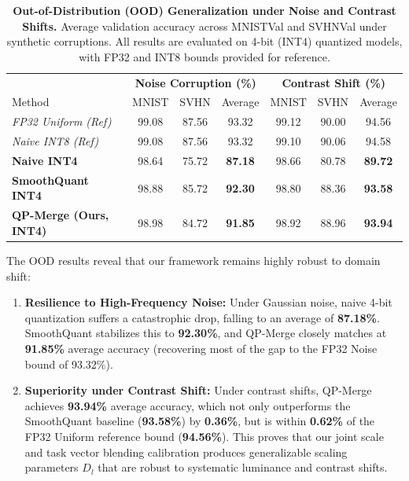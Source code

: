 \begin{table}[t]
\caption{\textbf{Out-of-Distribution (OOD) Generalization under Noise and Contrast Shifts.} Average validation accuracy across MNISTVal and SVHNVal under synthetic corruptions. All results are evaluated on 4-bit (INT4) quantized models, with FP32 and INT8 bounds provided for reference.}
\label{tab:ood_results}
\vskip 0.15in
\begin{center}
\begin{small}
\begin{sc}
\begin{tabular}{lcccccc}
\toprule
 & \multicolumn{3}{c}{\textbf{Noise Corruption (\%)}} & \multicolumn{3}{c}{\textbf{Contrast Shift (\%)}} \\
Method & MNIST & SVHN & Average & MNIST & SVHN & Average \\
\midrule
\textit{FP32 Uniform (Ref)} & 99.08 & 87.56 & 93.32 & 99.12 & 90.00 & 94.56 \\
\textit{Naive INT8 (Ref)}   & 99.08 & 87.56 & 93.32 & 99.10 & 90.06 & 94.58 \\
\midrule
\textbf{Naive INT4}         & 98.64 & 75.72 & \textbf{87.18} & 98.66 & 80.78 & \textbf{89.72} \\
\textbf{SmoothQuant INT4}   & 98.88 & 85.72 & \textbf{92.30} & 98.80 & 88.36 & \textbf{93.58} \\
\textbf{QP-Merge (Ours, INT4)} & 98.98 & 84.72 & \textbf{91.85} & 98.92 & 88.96 & \textbf{93.94} \\
\bottomrule
\end{tabular}
\end{sc}
\end{small}
\end{center}
\vskip -0.1in
\end{table}

The OOD results reveal that our framework remains highly robust to domain shift:
\begin{enumerate}
    \item \textbf{Resilience to High-Frequency Noise:} Under Gaussian noise, naive 4-bit quantization suffers a catastrophic drop, falling to an average of \textbf{87.18\%}. SmoothQuant stabilizes this to \textbf{92.30\%}, and QP-Merge closely matches at \textbf{91.85\%} average accuracy (recovering most of the gap to the FP32 Noise bound of 93.32\%).
    \item \textbf{Superiority under Contrast Shift:} Under contrast shifts, QP-Merge achieves \textbf{93.94\%} average accuracy, which not only outperforms the SmoothQuant baseline (\textbf{93.58\%}) by \textbf{0.36\%}, but is within \textbf{0.62\%} of the FP32 Uniform reference bound (\textbf{94.56\%}). This proves that our joint scale and task vector blending calibration produces generalizable scaling parameters $D_l$ that are robust to systematic luminance and contrast shifts.
\end{enumerate}

